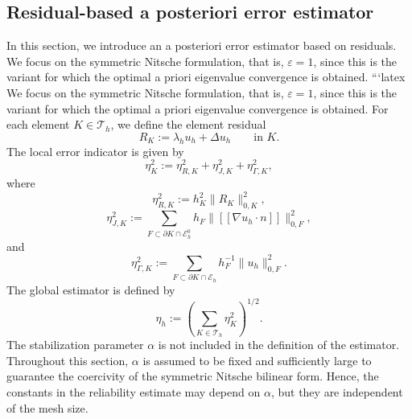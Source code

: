 \documentclass[onefignum,onetabnum,final]{siamart250211}
\def\CT{\mathcal{T}}
\numberwithin{equation}{section}
\newcommand\0{\boldsymbol{0}}
\renewcommand\O{\Omega}
\def\CT{{\mathcal T}}
\newcommand{\cred}[1]{\textcolor{red}{#1}}
\begin{document}
		
		
		\subsection{Residual-based a posteriori error estimator}
		In this section, we introduce an a posteriori error estimator based on residuals. We focus on the symmetric Nitsche formulation, that is, $\varepsilon=1$, since this is the variant for which the optimal a priori eigenvalue convergence is obtained. ```latex
We focus on the symmetric Nitsche formulation, that is, $\varepsilon=1$, since this is the variant for which the optimal a priori eigenvalue convergence is obtained. For each element $K\in\mathcal T_h$, we define the element residual
\[
   R_K:=\lambda_h u_h+\Delta u_h \qquad \text{in }K.
\]
The local error indicator is given by
\[
   \eta_K^2 := \eta_{R,K}^2+\eta_{J,K}^2+\eta_{\Gamma,K}^2,
\]
where
\[
   \eta_{R,K}^2 := h_K^2\|R_K\|_{0,K}^2,
\]
\[
   \eta_{J,K}^2 := \sum_{F\subset\partial K\cap\mathcal E_h^0}h_F\|[\![\nabla u_h\cdot n]\!]\|_{0,F}^2,
\]
and
\[
   \eta_{\Gamma,K}^2 := \sum_{F\subset\partial K\cap\mathcal E_h}h_F^{-1}\|u_h\|_{0,F}^2.
\]
The global estimator is defined by
\begin{equation}\label{errest1}
   \eta_h := \left(\sum_{K\in\mathcal{T}_h}\eta_K^2\right)^{1/2}.
\end{equation}
The stabilization parameter $\alpha$ is not included in the definition of the estimator. Throughout this section, $\alpha$ is assumed to be fixed and sufficiently large to guarantee the coercivity of the symmetric Nitsche bilinear form. Hence, the constants in the reliability estimate may depend on $\alpha$, but they are independent of the mesh size.
\end{document}
